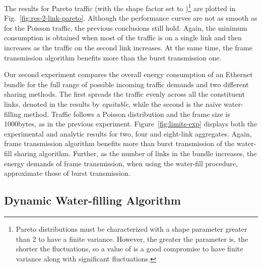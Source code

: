 \documentclass[journal,english,twocolumn,10pt,letterpaper]{IEEEtran}
\newcommand{\added}[1]{{#1}}
\newcommand{\addedfragile}[1]{{#1}}
\begin{document}
\begin{figure*}
  \centering
  \caption{\addedfragile
    {Results} for a 2-link bundle with Pareto traffic as a
    function of excess traffic load on the second link. Theoretical values
    omitted, as there is no closed form formula for Pareto
    arrivals~\cite{herreria12:_gi_g_model_gb_energ_effic_ether}.}
  \label{fig:res-2-link-pareto}
\end{figure*}
The results for Pareto traffic (with the shape factor  set to
)\footnote{Pareto distributions must be characterized with a shape
  parameter  greater than 2 to have a finite variance. However, the
  greater the  parameter is, the shorter the fluctuations, so a value
  of  is a good compromise to have finite variance along with significant
  fluctuations.} are plotted in \added{Fig.}~\ref{fig:res-2-link-pareto}. Although
the performance curves are not as smooth as for the Poisson traffic, the
previous conclusions still hold. Again, the minimum consumption is obtained
when most of the traffic is on a single link and then increases as the traffic
on the second link increases. At the same time, the frame transmission
algorithm benefits more than the burst transmission one.

Our second experiment compares the overall energy consumption of an Ethernet
bundle for the full range of possible incoming traffic demands and two
different sharing methods. The first spreads the traffic evenly across all the
constituent links, denoted in the results by \emph{equitable,} while the
second is the naïve water-filling method. Traffic follows a Poisson
distribution and the frame size is 1000bytes, as in the previous
experiment. Figure~\ref{fig:limits-exp} displays both the experimental and
analytic results for two, four and eight-link aggregates. Again, frame
transmission algorithm benefits more than burst transmission of the water-fill
sharing algorithm. Further, as the number of links in the bundle increases,
the energy demands of frame transmission, when using the water-fill procedure,
approximate those of burst transmission.


\subsection{Dynamic Water-filling Algorithm}
\label{sec:dynam-water-fill}
\end{document}
